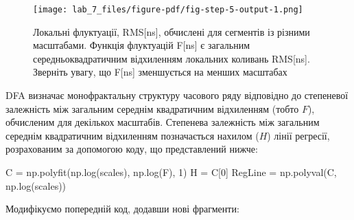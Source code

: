 \documentclass[
  letterpaper,
]{report}
\newenvironment{Shaded}{\begin{snugshade}}{\end{snugshade}}
\newcommand{\DecValTok}[1]{\textcolor[rgb]{0.68,0.00,0.00}{#1}}
\newcommand{\NormalTok}[1]{\textcolor[rgb]{0.00,0.23,0.31}{#1}}
\newcommand{\OperatorTok}[1]{\textcolor[rgb]{0.37,0.37,0.37}{#1}}
\begin{document}
\begin{figure}[H]

{\centering \texttt{[image: lab\_7\_files/figure-pdf/fig-step-5-output-1.png]}

}

\caption{\label{fig-step-5}Локальні флуктуації, RMS{[}ns{]}, обчислені
для сегментів із різними масштабами. Функція флуктуацій F{[}ns{]} є
загальним середньоквадратичним відхиленням локальних коливань
RMS{[}ns{]}. Зверніть увагу, що F{[}ns{]} зменшується на менших
масштабах}

\end{figure}

DFA визначає монофрактальну структуру часового ряду відповідно до
степеневої залежність між загальним середнім квадратичним відхиленням
(тобто \(F\)), обчисленим для декількох масштабів. Степенева залежність
між загальним середнім квадратичним відхиленням позначається нахилом
(\(H\)) лінії регресії, розрахованим за допомогою коду, що представлений
нижче:

\begin{Shaded}
\begin{Highlighting}[]
\NormalTok{C }\OperatorTok{=}\NormalTok{ np.polyfit(np.log(scales), np.log(F), }\DecValTok{1}\NormalTok{)}
\NormalTok{H }\OperatorTok{=}\NormalTok{ C[}\DecValTok{0}\NormalTok{]}
\NormalTok{RegLine }\OperatorTok{=}\NormalTok{ np.polyval(C, np.log(scales))}
\end{Highlighting}
\end{Shaded}

Модифікуємо попередній код, додавши нові фрагменти:
\end{document}
